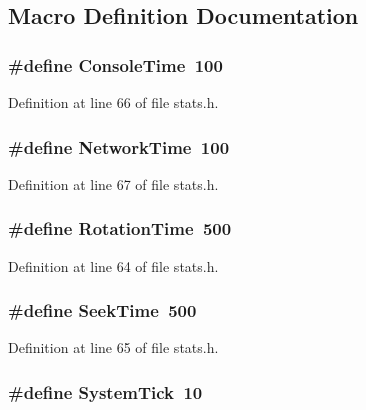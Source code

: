 \subsection{Macro Definition Documentation}
\subsubsection[{Console\+Time}]{\setlength{\rightskip}{0pt plus 5cm}\#define Console\+Time~100}\label{stats_8h_a2ca07405aac601cb648d4e6a11ebbd1d}


Definition at line 66 of file stats.\+h.

\subsubsection[{Network\+Time}]{\setlength{\rightskip}{0pt plus 5cm}\#define Network\+Time~100}\label{stats_8h_a4f7e7c57f153c0a15362fc1bd6684b77}


Definition at line 67 of file stats.\+h.

\subsubsection[{Rotation\+Time}]{\setlength{\rightskip}{0pt plus 5cm}\#define Rotation\+Time~500}\label{stats_8h_aeb38b1c6e537381b19fb2713561035d7}


Definition at line 64 of file stats.\+h.

\subsubsection[{Seek\+Time}]{\setlength{\rightskip}{0pt plus 5cm}\#define Seek\+Time~500}\label{stats_8h_a23e207fd391cb1227bbbf7cbe72e4a11}


Definition at line 65 of file stats.\+h.

\subsubsection[{System\+Tick}]{\setlength{\rightskip}{0pt plus 5cm}\#define System\+Tick~10}\label{stats_8h_a283cbd193ecf38fd6493d9494f2cfc63}


